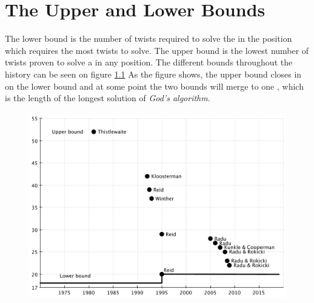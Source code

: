 \chapter{The Upper and Lower Bounds}
The lower bound is the number of twists required to solve the \rubik{} in the position which requires the most twists to solve.
The upper bound is the lowest number of twists proven to solve a \rubik{} in any position.
The different bounds throughout the history can be seen on figure \ref{fig:upperLowerBound}
As the figure shows, the upper bound closes in on the lower bound and at some point the two bounds will merge to one \cite{rokicki09}, which is the length of the longest solution of \textit{God's algorithm}.

\begin{figure}[ht]
	\centering
		\includegraphics[scale = 0.5]{input/pics/bounds2.pdf}
	\caption{}
	\label{fig:upperLowerBound}
\end{figure}




